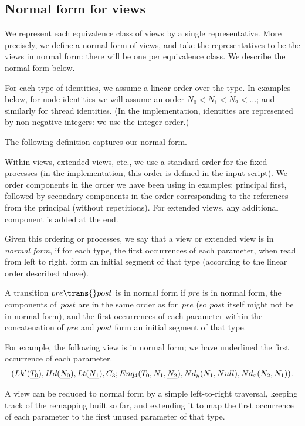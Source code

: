 
\subsection{Normal form for views}

We represent each equivalence class of views by a single representative.  More
precisely, we define a normal form of views, and take the representatives to
be the views in normal form: there will be one per equivalence class.  We
describe the normal form below. 

For each type of identities, we assume a linear order over the type.  In
examples below, for node identities we will assume an order $N_0 < N_1 <
N_2 < \ldots$; and similarly for thread identities.  (In the implementation,
identities are represented by non-negative integers: we use the integer
order.)

The following definition captures our normal form.
%
\begin{definition}
Within views, extended views, etc., we use a standard order for the fixed
processes (in the implementation, this order is defined in the input script).
We order components in the order we have been using in examples: principal
first, followed by secondary components in the order corresponding to the
references from the principal (without repetitions).  For extended views, any
additional component is added at the end.  

Given this ordering or processes, we say that a view or extended view is in
\emph{normal form}, if for each type, the first occurrences of each parameter,
when read from left to right, form an initial segment of that type (according
to the linear order described above).

A transition $pre \trans{} post$ is in normal form if $pre$ is in normal form,
the components of~$post$ are in the same order as for~$pre$ (so $post$ itself
might not be in normal form), and the first occurrences of each parameter
within the concatenation of $pre$ and $post$ form an initial segment of that
type.
\end{definition}

For example, the following view is in normal form; we have underlined the
first occurrence of each parameter.
\[
\begin{align}
(Lk'(\underline{T_0}), Hd(\underline{N_0}), 
    Lt(\underline{N_1}), C_3; 
  Enq_4(T_0, N_1, \underline{N_2}), Nd_y(N_1, Null),Nd_x(N_2, N_1)) .
\end{align}
\]


A view can be reduced to normal form by a simple left-to-right traversal,
keeping track of the remapping built so far, and extending it to map the first
occurrence of each parameter to the first unused parameter of that type.

